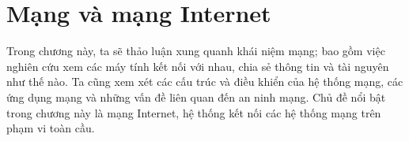 \chapter{Mạng và mạng Internet}

\minitoc
\vspace{0.5cm}
\noindent
Trong chương này, ta sẽ thảo luận xung quanh khái niệm mạng; bao gồm việc nghiên cứu xem các máy tính kết nối với nhau, chia sẻ thông tin và
tài nguyên như thế nào. Ta cũng xem xét các  cấu trúc và điều khiển của hệ thống mạng, các ứng dụng mạng và những vấn đề liên quan đến an ninh
mạng. Chủ đề nổi bật trong chương này là mạng Internet, hệ thống kết nối các hệ thống mạng trên phạm vi toàn cầu.


 







